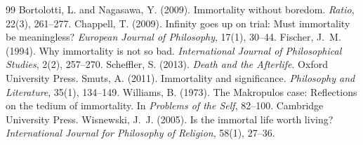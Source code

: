 \documentclass{situationist-preprint}
\begin{document}
\begin{thebibliography}{99}\small
{} Bortolotti, L. and Nagasawa, Y. (2009). Immortality without boredom. \emph{Ratio}, 22(3), 261--277.
 Chappell, T. (2009). Infinity goes up on trial: Must immortality be meaningless? \emph{European Journal of Philosophy}, 17(1), 30--44.
 Fischer, J.~M. (1994). Why immortality is not so bad. \emph{International Journal of Philosophical Studies}, 2(2), 257--270.
 Scheffler, S. (2013). \emph{Death and the Afterlife}. Oxford University Press.
 Smuts, A. (2011). Immortality and significance. \emph{Philosophy and Literature}, 35(1), 134--149.
 Williams, B. (1973). The Makropulos case: Reflections on the tedium of immortality. In \emph{Problems of the Self}, 82--100. Cambridge University Press.
 Wisnewski, J.~J. (2005). Is the immortal life worth living? \emph{International Journal for Philosophy of Religion}, 58(1), 27--36.
\end{thebibliography}
\end{document}
